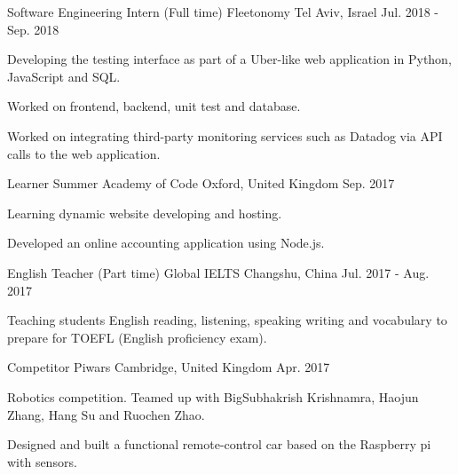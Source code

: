 \begin{cventries}
  \cventry
    {Software Engineering Intern (Full time)} %
    {Fleetonomy} %
    {Tel Aviv, Israel} %
    {Jul. 2018 - Sep. 2018} %
    {
      \begin{cvitems} %
        \item {Developing the testing interface as part of a Uber-like web application in Python, JavaScript and SQL.}
        \item {Worked on frontend, backend, unit test and database.}
        \item {Worked on integrating third-party monitoring services such as Datadog via API calls to the web application.}
      \end{cvitems}
    }
    
    \cventry
    {Learner} %
    {Summer Academy of Code} %
    {Oxford, United Kingdom} %
    {Sep. 2017} %
    {
      \begin{cvitems} %
        \item {Learning dynamic website developing and hosting.}
        \item {Developed an online accounting application using Node.js.}
      \end{cvitems}
    }

  \cventry
    {English Teacher (Part time)} %
    {Global IELTS} %
    {Changshu, China} %
    {Jul. 2017 - Aug. 2017} %
    {
      \begin{cvitems} %
        \item {Teaching students English reading, listening, speaking writing and vocabulary to prepare for TOEFL (English
        proficiency exam).}
      \end{cvitems}
    }
    
    \cventry
    {Competitor} %
    {Piwars} %
    {Cambridge, United Kingdom} %
    {Apr. 2017} %
    {
      \begin{cvitems} %
        \item {Robotics competition. Teamed up with BigSubhakrish Krishnamra, Haojun Zhang, Hang Su and Ruochen Zhao.}
        \item {Designed and built a functional remote-control car based on the Raspberry pi with sensors.}
      \end{cvitems}
    }
    
\end{cventries}
